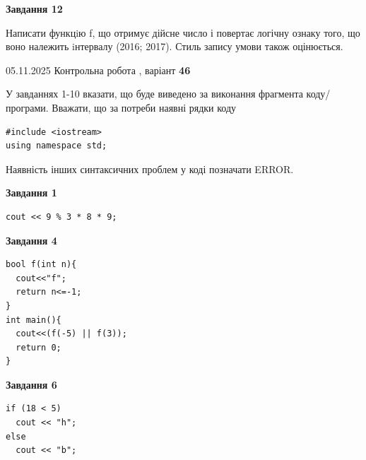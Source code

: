 \documentclass[12pt, ukrainian]{article}
\begin{document}
{\begin {large}
\begin{minipage}[t]{11.0cm}
\begin{center}
\textbf{Завдання 12}
\end{center}

Написати функцiю f, що отримує дійсне число і повертає логічну ознаку того, що воно належить iнтервалу (2016; 2017). Стиль запису умови також оцінюється.\par

\end{minipage}

\end {large}}
\newpage

{\Large{05.11.2025 Контрольна робота , варіант  \No \textbf { 46 }\par}}
{
\begin {large}
У завданнях 1-10 вказати, що буде виведено за виконання фрагмента коду/про\-гра\-ми.
Вважати, що за потреби наявні рядки коду
\begin{verbatim}
#include <iostream>
using namespace std;
\end{verbatim}
Наявність інших синтаксичних проблем у коді позначати ERROR.

\begin{minipage}[t]{7.0cm}

\begin{center}
\textbf{Завдання 1}
\end{center}
\vspace{-8mm}

\begin{verbatim}
cout << 9 % 3 * 8 * 9;
\end{verbatim}



\begin{center}
\textbf{Завдання 4}
\end{center}
\vspace{-8mm}

\begin{verbatim}
bool f(int n){
  cout<<"f";
  return n<=-1;
}
int main(){
  cout<<(f(-5) || f(3));
  return 0;
}
\end{verbatim}



\begin{center}
\textbf{Завдання 6}
\end{center}
\vspace{-8mm}

\begin{verbatim}
if (18 < 5)
  cout << "h";
else
  cout << "b";
\end{verbatim}




\end{minipage}
\end{large}}
\end{document}
